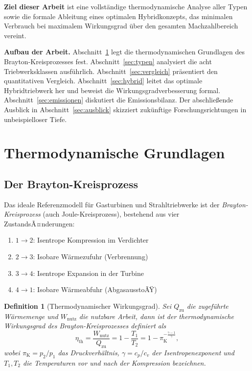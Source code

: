 ﻿\documentclass[12pt,a4paper]{article}
\newtheorem{definition}[theorem]{Definition}
\theoremstyle{remark}
\newcommand{\piK}{\pi_{\mathrm{K}}}
\newcommand{\etath}{\eta_{\mathrm{th}}}
\begin{document}
\medskip
\textbf{Ziel dieser Arbeit} ist eine vollst\"andige thermodynamische Analyse aller Typen
sowie die formale Ableitung eines optimalen Hybridkonzepts, das minimalen Verbrauch
bei maximalem Wirkungsgrad \"uber den gesamten Machzahlbereich vereint.

\medskip
\textbf{Aufbau der Arbeit.}
Abschnitt~\ref{sec:grundlagen} legt die thermodynamischen Grundlagen des
Brayton-Kreisprozesses fest.
Abschnitt~\ref{sec:typen} analysiert die acht Triebwerksklassen ausf\"uhrlich.
Abschnitt~\ref{sec:vergleich} pr\"asentiert den quantitativen Vergleich.
Abschnitt~\ref{sec:hybrid} leitet das optimale Hybridtriebwerk her und beweist
die Wirkungsgradverbesserung formal.
Abschnitt~\ref{sec:emissionen} diskutiert die Emissionsbilanz.
Der abschlie{\ss}ende Ausblick in Abschnitt~\ref{sec:ausblick} skizziert
zuk\"unftige Forschungsrichtungen in unbeispielloser Tiefe.

\section{Thermodynamische Grundlagen}
\label{sec:grundlagen}

\subsection{Der Brayton-Kreisprozess}

Das ideale Referenzmodell f\"ur Gasturbinen und Strahltriebwerke ist der
\emph{Brayton-Kreisprozess} (auch Joule-Kreisprozess), bestehend aus vier ZustandsÃ¤nderungen:

\begin{enumerate}[label=(\arabic*)]
  \item $1 \to 2$: Isentrope Kompression im Verdichter
  \item $2 \to 3$: Isobare W\"armezufuhr (Verbrennung)
  \item $3 \to 4$: Isentrope Expansion in der Turbine
  \item $4 \to 1$: Isobare W\"armeabfuhr (AbgasausstoÃŸ)
\end{enumerate}

\begin{definition}[Thermodynamischer Wirkungsgrad]
Sei $Q_{\mathrm{zu}}$ die zugef\"uhrte W\"armemenge und $W_{\mathrm{nutz}}$ die nutzbare Arbeit,
dann ist der thermodynamische Wirkungsgrad des Brayton-Kreisprozesses definiert als
\begin{equation}
  \etath = \frac{W_{\mathrm{nutz}}}{Q_{\mathrm{zu}}}
         = 1 - \frac{T_1}{T_2}
         = 1 - \piK^{-\frac{\gamma-1}{\gamma}},
  \label{eq:eta_brayton}
\end{equation}
wobei $\piK = p_2/p_1$ das Druckverh\"altnis, $\gamma = c_p/c_v$ der Isentropenexponent
und $T_1, T_2$ die Temperaturen vor und nach der Kompression bezeichnen.
\end{definition}
\end{document}
